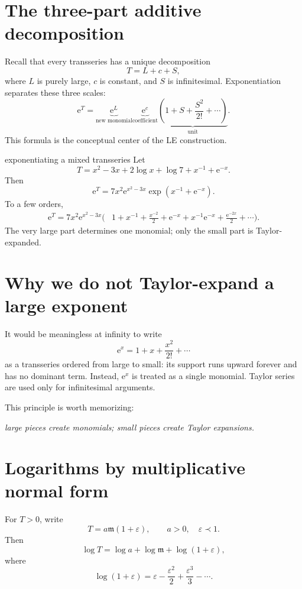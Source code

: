 \documentclass[11pt,openany]{book}
\theoremstyle{plain}
\theoremstyle{definition}
\theoremstyle{remark}
\newcommand{\m}{\mathfrak{m}}
\newcommand{\e}{\mathrm{e}}
\begin{document}
\section{The three-part additive decomposition}
Recall that every transseries has a unique decomposition
\[
  T=L+c+S,
\]
where $L$ is purely large, $c$ is constant, and $S$ is infinitesimal. Exponentiation separates these three scales:
\[
  \e^T=\underbrace{\e^L}_{\text{new monomial}}
        \underbrace{\e^c}_{\text{coefficient}}
        \underbrace{\left(1+S+\frac{S^2}{2!}+\cdots\right)}_{\text{unit}}.
\]
This formula is the conceptual center of the LE construction.

\begin{workedbox}{exponentiating a mixed transseries}
Let
\[
 T=x^2-3x+2\log x+\log 7+x^{-1}+\e^{-x}.
\]
Then
\[
 \e^T=7x^2\e^{x^2-3x}
 \exp(x^{-1}+\e^{-x}).
\]
To a few orders,
\begin{align*}
 \e^T
 =7x^2\e^{x^2-3x}\biggl(&1+x^{-1}+\frac{x^{-2}}2
 +\e^{-x}+x^{-1}\e^{-x}
 +\frac{\e^{-2x}}2+\cdots\biggr).
\end{align*}
The very large part determines one monomial; only the small part is Taylor-expanded.
\end{workedbox}

\section{Why we do not Taylor-expand a large exponent}
It would be meaningless at infinity to write
\[
  \e^x=1+x+\frac{x^2}{2!}+\cdots
\]
as a transseries ordered from large to small: its support runs upward forever and has no dominant term. Instead, $\e^x$ is treated as a single monomial. Taylor series are used only for infinitesimal arguments.

This principle is worth memorizing:
\begin{center}
\emph{large pieces create monomials; small pieces create Taylor expansions.}
\end{center}

\section{Logarithms by multiplicative normal form}
For $T>0$, write
\[
  T=a\m(1+\varepsilon),
  \qquad a>0,
  \quad \varepsilon\prec1.
\]
Then
\[
  \log T=\log a+\log\m+
  \log(1+\varepsilon),
\]
where
\[
  \log(1+\varepsilon)
  =\varepsilon-\frac{\varepsilon^2}{2}
  +\frac{\varepsilon^3}{3}-\cdots.
\]
\end{document}
